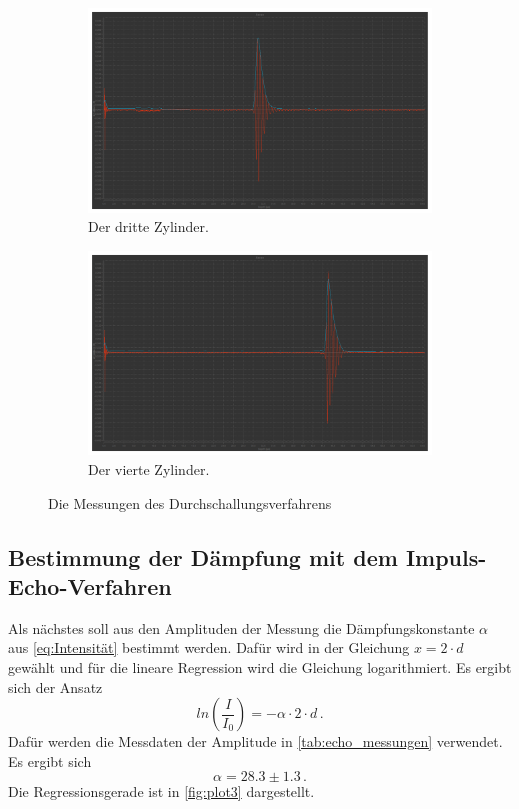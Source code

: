 \begin{figure}[H]
  \begin{subfigure}{0.48\textwidth}%
  \centering%
  \includegraphics[width=\linewidth]{pictures/Durchschallung/z3.pdf}%
  \caption{Der dritte Zylinder.}%
  \label{fig:durchschallung_z3}%
  \end{subfigure}%
  \hfill%
  \begin{subfigure}{0.48\textwidth}%
  \centering%
  \includegraphics[width=\linewidth]{pictures/Durchschallung/z4.pdf}%
  \caption{Der vierte Zylinder.}%
  \label{fig:durchschallung_z4}%
  \end{subfigure}%
  \hfill
  \caption{Die Messungen des Durchschallungsverfahrens}%
  \label{fig:durchschallung_messungen}%
\end{figure}%


\subsection{Bestimmung der Dämpfung mit dem Impuls-Echo-Verfahren}

Als nächstes soll aus den Amplituden der Messung die Dämpfungskonstante $\alpha$ aus \autoref{eq:Intensität} bestimmt werden.
Dafür wird in der Gleichung $x = 2 \cdot d$ gewählt und für die lineare Regression wird die Gleichung logarithmiert.
Es ergibt sich der Ansatz
\begin{equation*}
  ln \left( \frac{I}{I_0} \right) = - \alpha \cdot 2 \cdot d \, .
\end{equation*}
Dafür werden die Messdaten der Amplitude in \autoref{tab:echo_messungen} verwendet.
Es ergibt sich
\begin{equation*}
  \alpha = 28.3 \pm 1.3 \, .
\end{equation*}
Die Regressionsgerade ist in \autoref{fig:plot3} dargestellt.

